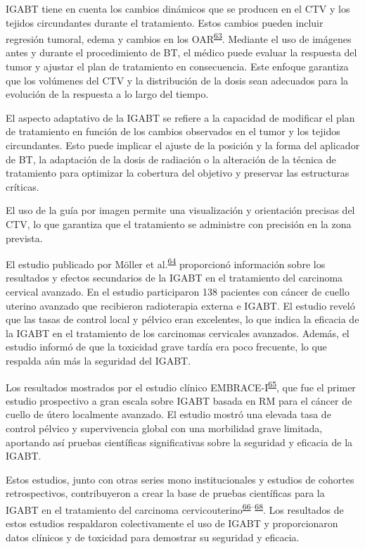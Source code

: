 \documentclass[
  a4paper,
]{scrreprt}
\begin{document}
IGABT tiene en cuenta los cambios dinámicos que se producen en el CTV y
los tejidos circundantes durante el tratamiento. Estos cambios pueden
incluir regresión tumoral, edema y cambios en los
OAR\textsuperscript{\protect\hyperlink{ref-puxf6tter2008}{63}}. Mediante
el uso de imágenes antes y durante el procedimiento de BT, el médico
puede evaluar la respuesta del tumor y ajustar el plan de tratamiento en
consecuencia. Este enfoque garantiza que los volúmenes del CTV y la
distribución de la dosis sean adecuados para la evolución de la
respuesta a lo largo del tiempo.

El aspecto adaptativo de la IGABT se refiere a la capacidad de modificar
el plan de tratamiento en función de los cambios observados en el tumor
y los tejidos circundantes. Esto puede implicar el ajuste de la posición
y la forma del aplicador de BT, la adaptación de la dosis de radiación o
la alteración de la técnica de tratamiento para optimizar la cobertura
del objetivo y preservar las estructuras críticas.

El uso de la guía por imagen permite una visualización y orientación
precisas del CTV, lo que garantiza que el tratamiento se administre con
precisión en la zona prevista.

El estudio publicado por Möller et
al.\textsuperscript{\protect\hyperlink{ref-muxf6ller2020}{64}}
proporcionó información sobre los resultados y efectos secundarios de la
IGABT en el tratamiento del carcinoma cervical avanzado. En el estudio
participaron 138 pacientes con cáncer de cuello uterino avanzado que
recibieron radioterapia externa e IGABT. El estudio reveló que las tasas
de control local y pélvico eran excelentes, lo que indica la eficacia de
la IGABT en el tratamiento de los carcinomas cervicales avanzados.
Además, el estudio informó de que la toxicidad grave tardía era poco
frecuente, lo que respalda aún más la seguridad del IGABT.

Los resultados mostrados por el estudio clínico
EMBRACE-I\textsuperscript{\protect\hyperlink{ref-puxf6tter2021}{65}},
que fue el primer estudio prospectivo a gran escala sobre IGABT basada
en RM para el cáncer de cuello de útero localmente avanzado. El estudio
mostró una elevada tasa de control pélvico y supervivencia global con
una morbilidad grave limitada, aportando así pruebas científicas
significativas sobre la seguridad y eficacia de la IGABT.

Estos estudios, junto con otras series mono institucionales y estudios
de cohortes retrospectivos, contribuyeron a crear la base de pruebas
científicas para la IGABT en el tratamiento del carcinoma
cervicouterino\textsuperscript{\protect\hyperlink{ref-tan2018}{66}--\protect\hyperlink{ref-sturdza2022}{68}}.
Los resultados de estos estudios respaldaron colectivamente el uso de
IGABT y proporcionaron datos clínicos y de toxicidad para demostrar su
seguridad y eficacia.
\end{document}
